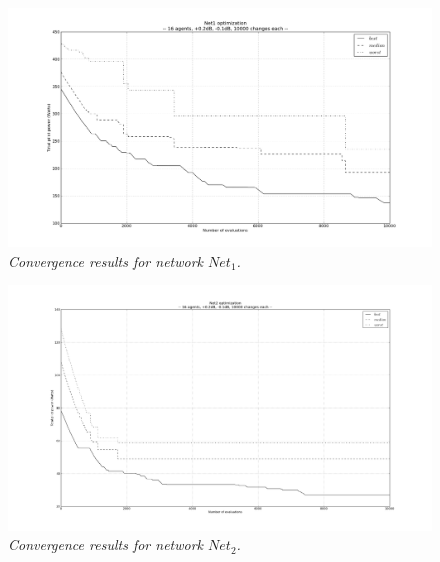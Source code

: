 \begin{figure}
\centering

\includegraphics[width=1\textwidth]{07-experimental_evaluation/img/convergence_1}

\caption{\textit{Convergence results for network $Net_{1}$.\label{fig:convergence_net1}}}
\end{figure}


\begin{figure}
\centering

\includegraphics[width=1\textwidth]{07-experimental_evaluation/img/convergence_2}

\caption{\textit{Convergence results for network $Net_{2}$.\label{fig:convergence_net2}}}
\end{figure}


